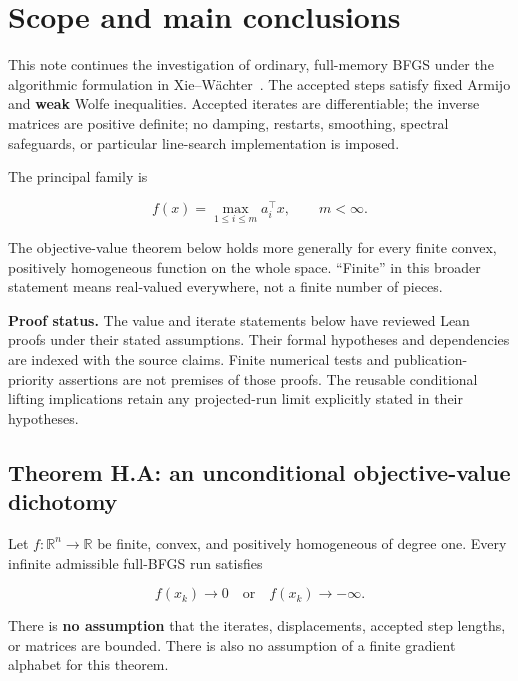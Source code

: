 \begingroup

\setcounter{section}{0}
\setcounter{theorem}{0}
\setcounter{lemma}{0}
\setcounter{corollary}{0}
\setcounter{proposition}{0}
\setcounter{remark}{0}
\setcounter{equation}{0}
\section{Scope and main
conclusions}\label{H:scope-and-main-conclusions}

This note continues the investigation of ordinary, full-memory BFGS
under the algorithmic formulation in Xie--W\"achter~\cite{XW}. The accepted
steps satisfy fixed Armijo and \textbf{weak} Wolfe inequalities.
Accepted iterates are differentiable; the inverse matrices are positive
definite; no damping, restarts, smoothing, spectral safeguards, or
particular line-search implementation is imposed.

The principal family is

\[
f(x)=\max_{1\le i\le m}a_i^\top x,\qquad m<\infty.
\]

The objective-value theorem below holds more generally for every finite
convex, positively homogeneous function on the whole space. ``Finite''
in this broader statement means real-valued everywhere, not a finite
number of pieces.

\textbf{Proof status.} The value and iterate statements below have reviewed Lean proofs under their stated assumptions. Their formal hypotheses and dependencies are indexed with the source claims. Finite numerical tests and publication-priority assertions are not premises of those proofs. The reusable conditional lifting implications retain any projected-run limit explicitly stated in their hypotheses.

\subsection{Theorem H.A: an unconditional objective-value
dichotomy}\label{H:theorem-a-an-unconditional-objective-value-dichotomy}

Let \(f:\mathbb R^n\to\mathbb R\) be finite, convex, and positively
homogeneous of degree one. Every infinite admissible full-BFGS run
satisfies

\[
\boxed{f(x_k)\longrightarrow0\quad\text{or}\quad f(x_k)\longrightarrow-\infty.}
\]

There is \textbf{no assumption} that the iterates, displacements,
accepted step lengths, or matrices are bounded. There is also no
assumption of a finite gradient alphabet for this theorem.

